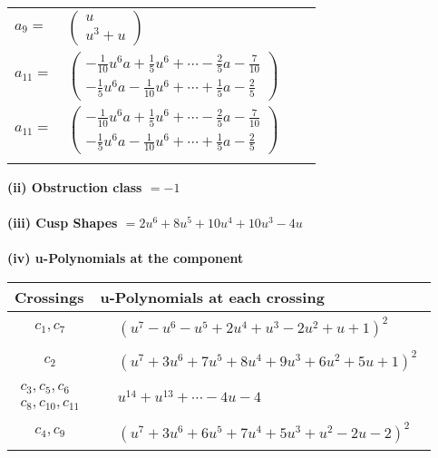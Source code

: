 \documentclass[1p]{elsarticle_modified}
\theoremstyle{definition}
\begin{document}
\begin{tabular}{m{7pt} m{180pt} m{7pt} m{180pt} }
\flushright $a_{9}=$&$\begin{pmatrix}u\\u^3+u\end{pmatrix}$ \\
\flushright $a_{11}=$&$\begin{pmatrix}-\frac{1}{10} u^6 a+\frac{1}{5} u^6+\cdots-\frac{2}{5} a-\frac{7}{10}\\-\frac{1}{5} u^6 a-\frac{1}{10} u^6+\cdots+\frac{1}{5} a-\frac{2}{5}\end{pmatrix}$\\ \flushright $a_{11}=$&$\begin{pmatrix}-\frac{1}{10} u^6 a+\frac{1}{5} u^6+\cdots-\frac{2}{5} a-\frac{7}{10}\\-\frac{1}{5} u^6 a-\frac{1}{10} u^6+\cdots+\frac{1}{5} a-\frac{2}{5}\end{pmatrix}$\\&\end{tabular}
\flushleft \textbf{(ii) Obstruction class $= -1$}\\~\\
\flushleft \textbf{(iii) Cusp Shapes $= 2 u^6+8 u^5+10 u^4+10 u^3-4 u$}\\~\\
\newpage\renewcommand{\arraystretch}{1}
\flushleft \textbf{(iv) u-Polynomials at the component}\newline \\
\begin{tabular}{m{50pt}|m{274pt}}
Crossings & \hspace{64pt}u-Polynomials at each crossing \\
\hline $$\begin{aligned}c_{1},c_{7}\end{aligned}$$&$\begin{aligned}
&(u^7- u^6- u^5+2 u^4+u^3-2 u^2+u+1)^2
\end{aligned}$\\
\hline $$\begin{aligned}c_{2}\end{aligned}$$&$\begin{aligned}
&(u^7+3 u^6+7 u^5+8 u^4+9 u^3+6 u^2+5 u+1)^2
\end{aligned}$\\
\hline $$\begin{aligned}c_{3},c_{5},c_{6}\\c_{8},c_{10},c_{11}\end{aligned}$$&$\begin{aligned}
&u^{14}+u^{13}+\cdots-4 u-4
\end{aligned}$\\
\hline $$\begin{aligned}c_{4},c_{9}\end{aligned}$$&$\begin{aligned}
&(u^7+3 u^6+6 u^5+7 u^4+5 u^3+u^2-2 u-2)^2
\end{aligned}$\\
\hline
\end{tabular}\\~\\
\end{document}
